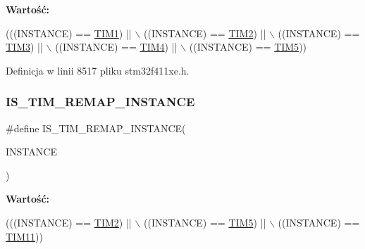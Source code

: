 {\bfseries Wartość\+:}
\begin{DoxyCode}
(((INSTANCE) == \hyperlink{group___peripheral__declaration_ga2e87451fea8dc9380056d3cfc5ed81fb}{TIM1}) || \(\backslash\)
                                                       ((INSTANCE) == \hyperlink{group___peripheral__declaration_ga3cfac9f2e43673f790f8668d48b4b92b}{TIM2}) || \(\backslash\)
                                                       ((INSTANCE) == \hyperlink{group___peripheral__declaration_ga61ee4c391385607d7af432b63905fcc9}{TIM3}) || \(\backslash\)
                                                       ((INSTANCE) == \hyperlink{group___peripheral__declaration_ga91a09bad8bdc7a1cb3d85cf49c94c8ec}{TIM4}) || \(\backslash\)
                                                       ((INSTANCE) == \hyperlink{group___peripheral__declaration_ga5125ff6a23a2ed66e2e19bd196128c14}{TIM5}))
\end{DoxyCode}


Definicja w linii 8517 pliku stm32f411xe.\+h.

\mbox{\label{group___exported__macros_ga6bb03cf116b07bfe1bd527f8ab61a7f9}} 
\subsubsection{\texorpdfstring{I\+S\+\_\+\+T\+I\+M\+\_\+\+R\+E\+M\+A\+P\+\_\+\+I\+N\+S\+T\+A\+N\+CE}{IS\_TIM\_REMAP\_INSTANCE}}
{\footnotesize\ttfamily \#define I\+S\+\_\+\+T\+I\+M\+\_\+\+R\+E\+M\+A\+P\+\_\+\+I\+N\+S\+T\+A\+N\+CE(\begin{DoxyParamCaption}\item[{}]{I\+N\+S\+T\+A\+N\+CE }\end{DoxyParamCaption})}

{\bfseries Wartość\+:}
\begin{DoxyCode}
(((INSTANCE) == \hyperlink{group___peripheral__declaration_ga3cfac9f2e43673f790f8668d48b4b92b}{TIM2})  || \(\backslash\)
                                         ((INSTANCE) == \hyperlink{group___peripheral__declaration_ga5125ff6a23a2ed66e2e19bd196128c14}{TIM5})  || \(\backslash\)
                                         ((INSTANCE) == \hyperlink{group___peripheral__declaration_gacfd11ef966c7165f57e2cebe0abc71ad}{TIM11}))
\end{DoxyCode}


